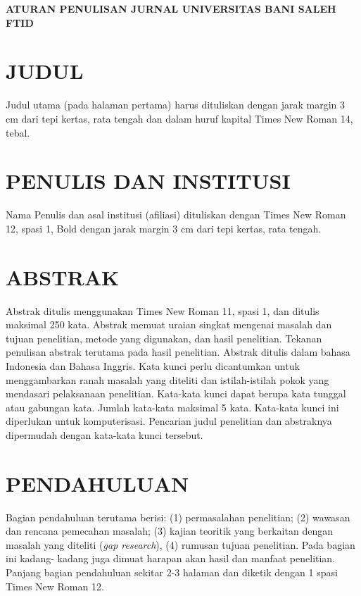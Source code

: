 \newpage

\begin{center}
    {\large\bfseries ATURAN PENULISAN JURNAL UNIVERSITAS BANI SALEH FTID\par}
\end{center}

\vspace{4pt}
\normalsize

\section{JUDUL}
Judul utama (pada halaman pertama) harus dituliskan dengan jarak margin 3
cm dari tepi kertas, rata tengah dan dalam huruf kapital Times New Roman 14, tebal.

\section{PENULIS DAN INSTITUSI}
Nama Penulis dan asal institusi (afiliasi) dituliskan dengan Times New Roman
12, spasi 1, Bold dengan jarak margin 3 cm dari tepi kertas, rata tengah.

\section{ABSTRAK}
Abstrak ditulis menggunakan Times New Roman 11, spasi 1, dan ditulis
maksimal 250 kata. Abstrak memuat uraian singkat mengenai masalah dan tujuan
penelitian, metode yang digunakan, dan hasil penelitian. Tekanan penulisan abstrak
terutama pada hasil penelitian. Abstrak ditulis dalam bahasa Indonesia dan Bahasa
Inggris. Kata kunci perlu dicantumkan untuk menggambarkan ranah masalah yang
diteliti dan istilah-istilah pokok yang mendasari pelaksanaan penelitian. Kata-kata kunci
dapat berupa kata tunggal atau gabungan kata. Jumlah kata-kata maksimal 5 kata.
Kata-kata kunci ini diperlukan untuk komputerisasi. Pencarian judul penelitian dan
abstraknya dipermudah dengan kata-kata kunci tersebut.

\section{PENDAHULUAN}
Bagian pendahuluan terutama berisi: (1) permasalahan penelitian; (2) wawasan
dan rencana pemecahan masalah; (3) kajian teoritik yang berkaitan dengan masalah
yang diteliti (\textit{gap research}), (4) rumusan tujuan penelitian. Pada bagian ini kadang-
kadang juga dimuat harapan akan hasil dan manfaat penelitian. Panjang bagian
pendahuluan sekitar 2-3 halaman dan diketik dengan 1 spasi Times New Roman 12.


